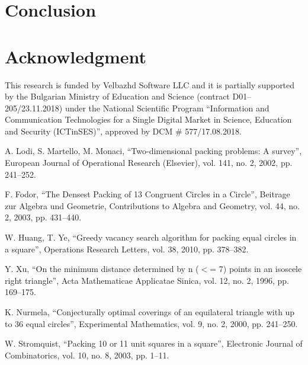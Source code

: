 \documentclass[conference]{IEEEtran}
\begin{document}
\section{Conclusion}

\section*{Acknowledgment}

This research is funded by Velbazhd Software LLC and it is partially supported by the Bulgarian Ministry of Education and Science (contract D01–205/23.11.2018) under the National Scientific Program ``Information and Communication Technologies for a Single Digital Market in Science, Education and Security (ICTinSES)'', approved by DCM \# 577/17.08.2018.

\begin{thebibliography}{00}

 A. Lodi, S. Martello, M. Monaci, ``Two-dimensional packing problems: A survey'', European Journal of Operational Research (Elsevier), vol. 141, no. 2, 2002, pp. 241--252.

 F. Fodor, ``The Densest Packing of 13 Congruent Circles in a Circle'', Beitrage zur Algebra und Geometrie, Contributions to Algebra and Geometry, vol. 44, no. 2, 2003, pp. 431--440.

 W. Huang, T. Ye, ``Greedy vacancy search algorithm for packing equal circles in a square'', Operations Research Letters, vol. 38, 2010, pp. 378--382.

 Y. Xu, ``On the minimum distance determined by n ($<$= 7) points in an isoscele right triangle'', Acta Mathematicae Applicatae Sinica, vol. 12, no. 2, 1996, pp. 169--175.

 K. Nurmela, ``Conjecturally optimal coverings of an equilateral triangle with up to 36 equal circles'', Experimental Mathematics, vol. 9, no. 2, 2000, pp. 241--250.

 W. Stromquist, ``Packing 10 or 11 unit squares in a square'', Electronic Journal of Combinatorics, vol. 10, no. 8, 2003, pp. 1--11.

\end{thebibliography}
\end{document}
